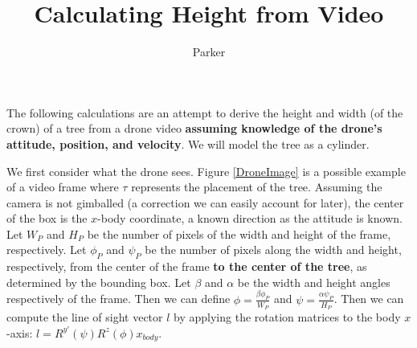 \documentclass[10pt,a4paper]{article}
\author{Parker}
\title{Calculating Height from Video}
\begin{document}
\maketitle

The following calculations are an attempt to derive the height and width (of the crown) of a tree from a drone video \textbf{assuming knowledge of the drone's attitude, position, and velocity}. We will model the tree as a cylinder. 

We first consider what the drone sees. Figure \ref{DroneImage} is a possible example of a video frame where $\tau$ represents the placement of the tree. Assuming the camera is not gimballed (a correction we can easily account for later), the center of the box is the $x$-body coordinate, a known direction as the attitude is known. Let $W_P$ and $H_P$ be the number of pixels of the width and height of the frame, respectively. Let $\phi_P$ and $\psi_P$ be the number of pixels along the width and height, respectively, from the center of the frame \textbf{to the center of the tree}, as determined by the bounding box. Let $\beta$ and $\alpha$ be the width and height angles respectively of the frame. Then we can define $\phi = \frac{\beta\phi_P}{W_P}$ and $\psi=\frac{\alpha \psi_P}{H_P}$. Then we can compute the line of sight vector $l$ by applying the rotation matrices to the body $x$-axis: $l = R^{y'}(\psi)R^z(\phi)x_{body}$. 
\end{document}

